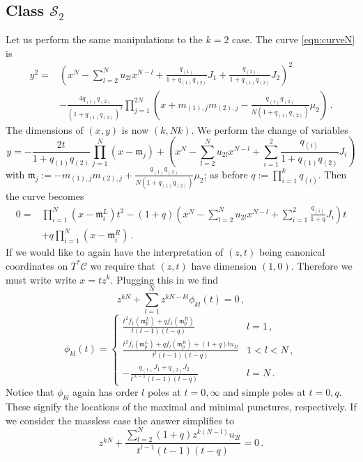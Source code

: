 \documentclass[main.tex]{subfiles}
\begin{document}
\subsection{Class \texorpdfstring{$\mathcal{S}_2$}{S2}}
Let us perform the same manipulations to the $k=2$ case. The curve \eqref{eqn:curveN} is
\begin{equation}
\begin{aligned}
y^2=&\left(x^N-\sum_{l=2}^Nu_{2l}x^{N-l}+\frac{q_{(1)}}{1+q_{(1)}q_{(2)}}J_1+\frac{q_{(2)}}{1+q_{(1)}q_{(2)}}J_2\right)^2\\
&-\frac{4q_{(1)}q_{(2)}}{(1+q_{(1)}q_{(2)})^2}\prod_{j=1}^{2N}\left(x+m_{(1),j}m_{(2),j}-\frac{q_{(1)}q_{(2)}}{N(1+q_{(1)}q_{(2)})}\mu_2\right)\,.
\end{aligned}
\end{equation}
The dimensions of $(x,y)$ is now $(k,Nk)$. We perform the change of variables
\begin{equation}
y=-\frac{2t}{1+q_{(1)}q_{(2)}}\prod_{j=1}^N\left(x-\mathfrak{m}_j\right)+\left(x^N-\sum_{l=2}^Nu_{2l}x^{N-l}+\sum_{i=1}^2\frac{q_{(i)}}{1+q_{(1)}q_{(2)}}J_i\right)
\end{equation}
with $\mathfrak{m}_j:=-m_{(1),j}m_{(2),j}+\frac{q_{(1)}q_{(2)}}{N(1+q_{(1)}q_{(2)})}\mu_2$; as before $q:=\prod_{i=1}^kq_{(i)}$. Then the curve becomes
\begin{equation}
\begin{aligned}
0=&\prod_{i=1}^N(x-\mathfrak{m}^L_i)t^2-(1+q)\left(x^N-\sum_{l=2}^Nu_{2l}x^{N-l}+\sum_{i=1}^2\frac{q_{(i)}}{1+q}J_i\right)t\\
&+q\prod_{i=1}^{N}(x-\mathfrak{m}^R_i)\,.
\end{aligned}
\end{equation}
If we would like to again have the interpretation of $(z,t)$ being canonical coordinates on $T^*\mathcal{C}$ we require that $(z,t)$ have dimension $(1,0)$. Therefore we must write write $x=tz^k$. Plugging this in we find
\begin{equation}
z^{kN}+\sum_{l=1}^Nz^{kN-kl}\phi_{kl}(t)=0\,,
\end{equation}
\begin{equation}
\phi_{kl}(t)=\begin{cases}
\frac{t^{2}f_1(\mathfrak{m}^{L}_p)+qf_1(\mathfrak{m}_p^R)}{t(t-1)(t-q)}& l=1\,,\\
\frac{t^{2}f_l(\mathfrak{m}^{L}_p)+qf_l(\mathfrak{m}_p^R)+(1+q)tu_{2l}}{t^l(t-1)(t-q)}&1<l<N\,,\\
-\frac{q_{(1)}J_1+q_{(2)}J_2}{t^{N-1}(t-1)(t-q)}&l=N\,.
\end{cases}
\end{equation}
Notice that $\phi_{kl}$ again has order $l$ poles at $t=0,\infty$ and simple poles at $t=0,q$. These signify the locations of the maximal and minimal punctures, respectively.
If we consider the massless case the answer simplifies to
\begin{equation}
z^{kN}+\frac{\sum_{l=2}^N(1+q)z^{k(N-l)}u_{2l}}{t^{l-1}(t-1)(t-q)}=0\,.
\end{equation}
\end{document}
